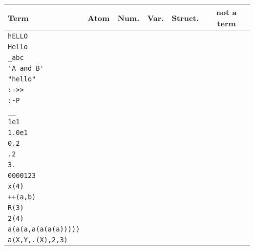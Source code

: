 \def\OK{\only<2->{\color{green!50!black}$\surd$}}

\begin{frame}[fragile]
\scriptsize

\begin{tabular}{|l|c|c|c|c|c|}\hline
\rowcolor{blue!40!white}
Term  & Atom & Num. & Var. & Struct. & not a term \\ \hline
\lstinline!hELLO!  & \OK    &       &       &       	&	\\ \hline
\lstinline!Hello!  &     &       & \OK      &       	&	\\ \hline
\lstinline!_abc!  &     &       &   \OK     &       	&	\\ \hline
\lstinline!'A and B'!  &  \OK    &       &       &       	&	\\ \hline
\lstinline!"hello"! &   &   &   &  \OK  &   \\ \hline
\lstinline!:->>!   &  \OK    &       &       &       	&	\\ \hline
\lstinline!:-P!    &     &       &       &       	&\OK 	\\ \hline
\lstinline!__!  &     &       &  \OK      &       	&	\\ \hline
\lstinline!1e1!  &     &       &       &       	&\OK 	\\ \hline
\lstinline!1.0e1!  &     &   \OK     &       &       	&	\\ \hline
\lstinline!0.2!  &     &  \OK      &       &       	&	\\ \hline
\lstinline!.2!  &     &       &       &       	&\OK 	\\ \hline
\lstinline!3.!  &     &       &       &       	&\OK 	\\ \hline
\lstinline!0000123!  &     &   \OK    &       &       	& 	\\ \hline
\lstinline!x(4)!  &     &       &       &  \OK      	&	\\ \hline
\lstinline!++(a,b)!  &     &       &       & \OK       	&	\\ \hline
\lstinline!R(3)!  &     &       &       &       	&	\OK \\ \hline
\lstinline!2(4)!  &     &       &       &       	&\OK 	\\ \hline
\lstinline!a(a(a,a(a(a(a)))))!  &     &       &   \OK     &       	&	\\ \hline
\lstinline!a(X,Y,.(X),2,3)!  &     &       &       &     \OK   	&	\\ \hline
\end{tabular}
\end{frame}

